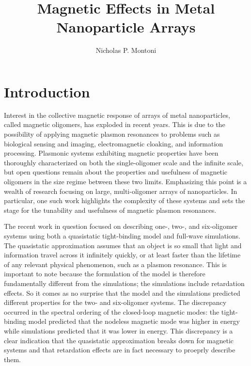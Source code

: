 \documentclass[12pt, letterpaper, twoside]{report}
\title{Magnetic Effects in Metal Nanoparticle Arrays}
\author{Nicholas P. Montoni}
\date{\center{Wednesday, August 16, 2017\\Chemistry Building 339, 9:30 AM}}
\begin{document}
\begin{titlepage}
\maketitle
\end{titlepage}

\section*{Introduction}
Interest in the collective magnetic response of arrays of metal nanoparticles, called magnetic oligomers, has exploded in recent years. This is due to the possibility of applying magnetic plasmon resonances to problems such as biological sensing and imaging, electromagnetic cloaking, and information processing\cite{Zia2010trans,Noginova2008trans,Wang:13,Fan2015,Wei2015,Shvets2012,Altug2012bio,Nord2011fano,Zhang2006,NordHal2011,NordHal2012}. Plasmonic systems exhibiting magnetic properties have been thoroughly characterized on both the single-oligomer scale and the infinite scale, but open questions remain about the properties and usefulness of magnetic oligomers in the size regime between these two limits\cite{Dionne2016,Weick2013,Engheta2017}. Emphasizing this point is a wealth of research focusing on large, multi-oligomer arrays of nanoparticles. In particular, one such work highlights the complexity of these systems and sets the stage for the tunability and usefulness of magnetic plasmon resonances.

The recent work in question focused on describing one-, two-, and six-oligomer systems using both a quasistatic tight-binding model and full-wave simulations. The quasistatic approximation assumes that an object is so small that light and information travel across it infinitely quickly, or at least faster than the lifetime of any relevant physical phenomenon, such as a plasmon resonance. This is important to note because the formulation of the model is therefore fundamentally different from the simulations; the simulations include retardation effects. So it comes as no surprise that the model and the simulations predicted different properties for the two- and six-oligomer systems. The discrepancy occurred in the spectral ordering of the closed-loop magnetic modes: the tight-binding model predicted that the nodeless magnetic mode was higher in energy while simulations predicted that it was lower in energy. This discrepancy is a clear indication that the quasistatic approximation breaks down for magnetic systems and that retardation effects are in fact necessary to proeprly describe them.
\end{document}
